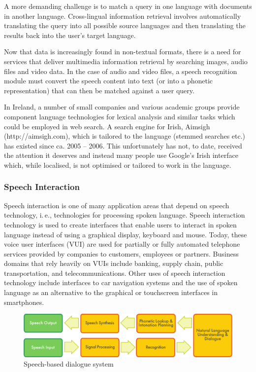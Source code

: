 \begin{multicols}{2}

A more demanding challenge is to match a query in one language with documents in another language. Cross-lingual information retrieval involves automatically translating the query into all possible source languages and then translating the results back into the user's target language.

Now that data is increasingly found in non-textual formats, there is a need for services that deliver multimedia information retrieval by searching images, audio files and video data. In the case of audio and video files, a speech recognition module must convert the speech content into text (or into a phonetic representation) that can then be matched against a user query.

In Ireland, a number of small companies and various academic groups provide component language technologies for lexical analysis and similar tasks which could be employed in web search. A search engine for Irish, Aimsigh (http://aimsigh.com), which is tailored to the language (stemmed searches etc.) has existed since ca. 2005 -- 2006. This unfortunately has not, to date, received the attention it deserves and instead many people use Google’s Irish interface which, while localised, is not optimised or tailored to work in the language.

\subsubsection{Speech Interaction}

Speech interaction is one of many application areas that depend on speech technology, i.\,e., technologies for processing spoken language. Speech interaction technology is used to create interfaces that enable users to interact in spoken language instead of using a graphical display, keyboard and mouse.  Today, these voice user interfaces (VUI) are used for partially or fully automated telephone services provided by companies to customers, employees or partners. Business domains that rely heavily on VUIs include banking, supply chain, public transportation, and telecommunications. Other uses of speech interaction technology include interfaces to car navigation systems and the use of spoken language as an alternative to the graphical or touchscreen interfaces in smartphones.

\begin{figure}[htb]
  \center
  \includegraphics[width=\textwidth]{../_media/english/simple_speech-based_dialogue_architecture}
  \caption{Speech-based dialogue system}
  \label{fig:dialoguearch_en}
\end{figure}


\end{multicols}
